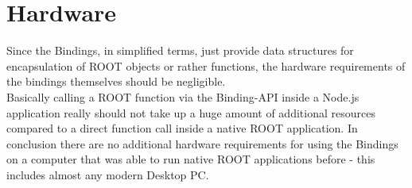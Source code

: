 \section{Hardware}
Since the Bindings, in simplified terms, just provide data structures for encapsulation of ROOT objects or rather functions, the hardware requirements of the bindings themselves should be negligible.\\
Basically calling a ROOT function via the Binding-API inside a Node.js application really should not take up a huge amount of additional resources compared to a direct function call inside a native ROOT application.
In conclusion there are no additional hardware requirements for using the Bindings on a computer that was able to run native ROOT applications before - this includes almost any modern Desktop PC.
